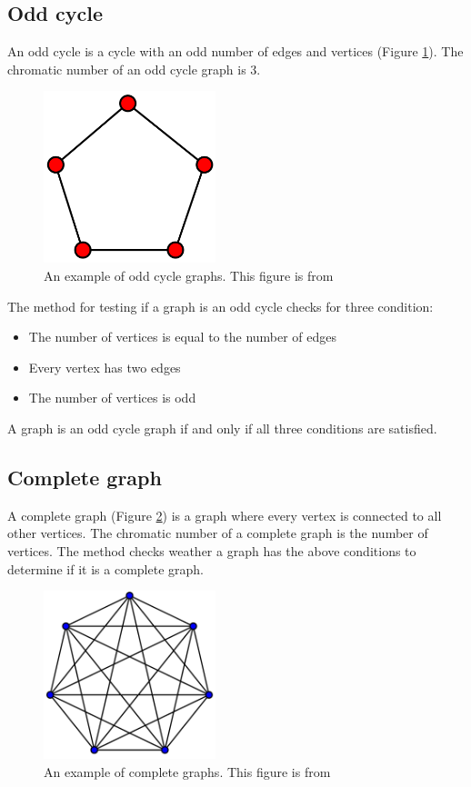 \documentclass[a4paper]{report}
\begin{document}
			\subsection{Odd cycle}
			An odd cycle is a cycle with an odd number of edges and vertices (Figure \ref{fig:oddcycle}). The chromatic number of an odd cycle graph is 3. \\
			
			\begin{figure}[h]
				\centering
				\includegraphics[width=50mm,scale=0.5]{figures/cycle.png}
				\caption{An example of odd cycle graphs. This figure is from \protect\cite{cycleFig}}
				\label{fig:oddcycle}
			\end{figure}
		
			The method for testing if a graph is an odd cycle checks for three condition:
			\begin{itemize}
				\item The number of vertices is equal to the number of edges
				\item Every vertex has two edges
				\item The number of vertices is odd
			\end{itemize}
			A graph is an odd cycle graph if and only if all three conditions are satisfied.
			
			\subsection{Complete graph}
			A complete graph (Figure \ref{fig:complete}) is a graph where every vertex is connected to all other vertices. The chromatic number of a complete graph is the number of vertices. The method checks weather a graph has the above conditions to determine if it is a complete graph.
			\begin{figure}[h]
				\centering
				\includegraphics[width=50mm,scale=0.5]{figures/complete.png}
				\caption{An example of complete graphs. This figure is from \protect\cite{completeFig}}
				\label{fig:complete}
			\end{figure}
			
\end{document}
